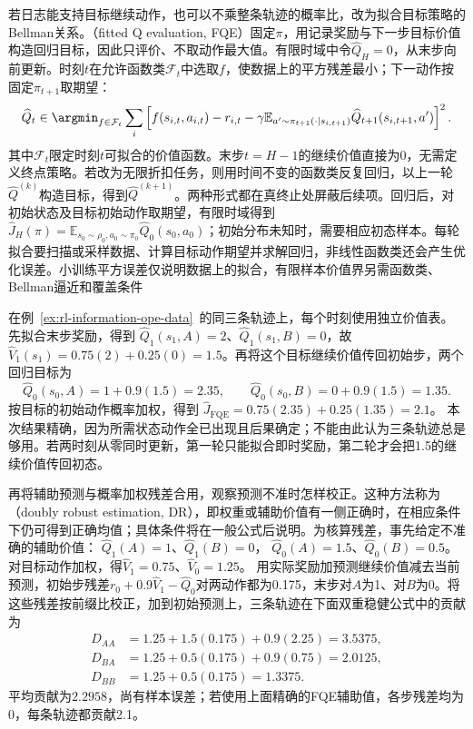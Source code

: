 若日志能支持目标继续动作，也可以不乘整条轨迹的概率比，改为拟合目标策略的Bellman关系。（fitted Q evaluation, FQE）固定$\pi$，用记录奖励与下一步目标价值构造回归目标，因此只评价、不取动作最大值。有限时域中令$\widehat Q_H=0$，从末步向前更新。时刻$t$在允许函数类$\mathcal F_t$中选取$f$，使数据上的平方残差最小；下一动作按固定$\pi_{t+1}$取期望：
\begin{equation}
  \label{eq:rl-information-fqe}
  \widehat Q_t
  \in\argmin_{f\in\mathcal F_t}
    \sum_{i}
    \left[
      f(s_{i,t},a_{i,t})
      -r_{i,t}
      -\gamma\mathbb E_{a'\sim\pi_{t+1}(\cdot\mid s_{i,t+1})}
                       \widehat Q_{t+1}(s_{i,t+1},a')
    \right]^2.
\end{equation}
其中$\mathcal F_t$限定时刻$t$可拟合的价值函数。末步$t=H-1$的继续价值直接为0，无需定义终点策略。若改为无限折扣任务，则用时间不变的函数类反复回归，以上一轮$\widehat Q^{(k)}$构造目标，得到$\widehat Q^{(k+1)}$。两种形式都在真终止处屏蔽后续项。回归后，对初始状态及目标初始动作取期望，有限时域得到$\widehat J_H(\pi)=\mathbb E_{s_0\sim\rho_0,a_0\sim\pi_0}\widehat Q_0(s_0,a_0)$；初始分布未知时，需要相应初态样本。每轮拟合要扫描或采样数据、计算目标动作期望并求解回归，非线性函数类还会产生优化误差。小训练平方误差仅说明数据上的拟合，有限样本价值界另需函数类、Bellman逼近和覆盖条件

\begin{example}[在同一日志上完成FQE与DR]
  \label{ex:rl-information-fqe-dr}
  在例~\ref{ex:rl-information-ope-data}~的同三条轨迹上，每个时刻使用独立价值表。先拟合末步奖励，得到
  $\widehat Q_1(s_1,A)=2$、$\widehat Q_1(s_1,B)=0$，故
  $\widehat V_1(s_1)=0.75(2)+0.25(0)=1.5$。再将这个目标继续价值传回初始步，两个回归目标为
  \[
    \widehat Q_0(s_0,A)=1+0.9(1.5)=2.35,\qquad
    \widehat Q_0(s_0,B)=0+0.9(1.5)=1.35.
  \]
  按目标的初始动作概率加权，得到
  $\widehat J_{\mathrm{FQE}}=0.75(2.35)+0.25(1.35)=2.1$。
  本次结果精确，因为所需状态动作全已出现且后果确定；不能由此认为三条轨迹总是够用。若两时刻从零同时更新，第一轮只能拟合即时奖励，第二轮才会把1.5的继续价值传回初态。

  再将辅助预测与概率加权残差合用，观察预测不准时怎样校正。这种方法称为（doubly robust estimation, DR），即权重或辅助价值有一侧正确时，在相应条件下仍可得到正确均值；具体条件将在一般公式后说明。为核算残差，事先给定不准确的辅助价值：
  $\widehat Q_1(A)=1$、$\widehat Q_1(B)=0$，
  $\widehat Q_0(A)=1.5$、$\widehat Q_0(B)=0.5$。
  对目标动作加权，得$\widehat V_1=0.75$、$\widehat V_0=1.25$。
  用实际奖励加预测继续价值减去当前预测，初始步残差$r_0+0.9\widehat V_1-\widehat Q_0$对两动作都为0.175，末步对$A$为1、对$B$为0。将这些残差按前缀比校正，加到初始预测上，三条轨迹在下面双重稳健公式中的贡献为
  \[
  \begin{aligned}
    D_{AA}&=1.25+1.5(0.175)+0.9(2.25)=3.5375,\\
    D_{BA}&=1.25+0.5(0.175)+0.9(0.75)=2.0125,\\
    D_{BB}&=1.25+0.5(0.175)=1.3375.
  \end{aligned}
  \]
  平均贡献为$2.2958$，尚有样本误差；若使用上面精确的FQE辅助值，各步残差均为0，每条轨迹都贡献2.1。
\end{example}

